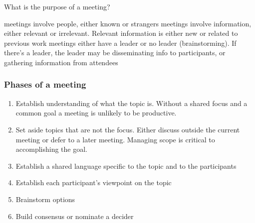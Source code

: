 What is the purpose of a meeting?

meetings involve people, either known or strangers
meetings involve information, either relevant or irrelevant. Relevant information is either new or related to previous work
meetings either have a leader or no leader (brainstorming). If there's a leader, the leader may be disseminating info to participants, or gathering information from attendees


\subsubsection{Phases of a meeting}

\begin{enumerate}
    \item Establish understanding of what the topic is. Without a shared focus and a common goal a meeting is unlikely to be productive. 
    \item Set aside topics that are not the focus. Either discuss outside the current meeting or defer to a later meeting. Managing scope is critical to accomplishing the goal. 
    \item Establish a shared language specific to the topic and to the participants
    \item Establish each participant's viewpoint on the topic
    \item Brainstorm options
    \item Build consensus or nominate a decider
\end{enumerate}